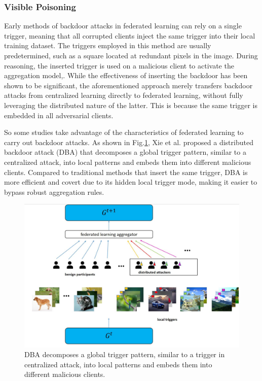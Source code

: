 \documentclass[conference]{IEEEtran}
\begin{document}
\subsubsection{Visible Poisoning}
Early methods of  backdoor attacks in federated learning can rely on a single trigger,
meaning that all corrupted clients inject the same trigger into their local
training dataset. The triggers employed in this method are usually predetermined,
such as a square located at redundant pixels in the image. During reasoning,
the inserted trigger is used on a malicious client to activate the aggregation model\cite{b24},\cite{b27}.
While the effectiveness of inserting the backdoor has been shown to be significant,
the aforementioned approach merely transfers backdoor attacks from centralized
learning directly to federated learning, without fully leveraging
the distributed nature of the latter. This is
because the same trigger is embedded in all adversarial clients.

So some studies take advantage of the characteristics of federated learning to carry out backdoor attacks.
As shown in Fig.\ref{fig8}, Xie et al. \cite{b59} proposed a distributed backdoor attack (DBA) that decomposes a global trigger 
pattern, similar to a centralized attack, into local patterns and embeds
them into different malicious clients. Compared to traditional methods that insert
the same trigger, DBA is more efficient and covert due to its hidden local
trigger mode, making it easier to bypass robust aggregation rules.

\begin{figure}[htbp]
    \centerline{\includegraphics[width=0.8\linewidth,height=0.6\linewidth]{picture/f8.jpg}}
    \caption{DBA decomposes a global trigger 
    pattern, similar to a trigger in centralized attack, into local patterns and embeds
    them into different malicious clients.}
    \label{fig8}
\end{figure}
\end{document}

